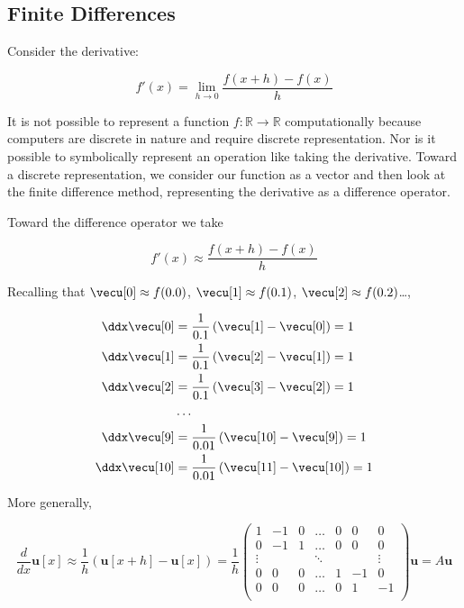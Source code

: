 \documentclass[12pt,]{book}
\begin{document}
\subsection{Finite Differences}\label{finite-differences}

Consider the derivative:

\begin{equation}f'(x)=\lim_{h\to 0} \frac{f(x+h)-f(x)}{h}\label{eq:first_derivative}\end{equation}

It is not possible to represent a function
\(f: \mathbb{R} \to \mathbb{R}\) computationally because computers are
discrete in nature and require discrete representation. Nor is it
possible to symbolically represent an operation like taking the
derivative. Toward a discrete representation, we consider our function
as a vector and then look at the finite difference method, representing
the derivative as a difference operator.

Toward the difference operator we take

\begin{equation}f'(x)\approx \frac{f(x+h)-f(x)}{h}\label{eq:first_difference}\end{equation}

Recalling that \(\vecu[0]\approx f(0.0)\), \(\vecu[1]\approx f(0.1)\),
\(\vecu[2]\approx f(0.2)\)\dots,

\begin{align*}
\ddx\vecu[0] &= \frac{1}{0.1}\left(\vecu[1] -\vecu[0]\right) = 1\\
\ddx\vecu[1] &= \frac{1}{0.1}\left(\vecu[2] -\vecu[1]\right) = 1\\
\ddx\vecu[2] &= \frac{1}{0.1}\left(\vecu[3] -\vecu[2]\right) = 1\\
&\dots\\
\ddx\vecu[9] &= \frac{1}{0.01}\left(\vecu[10] -\vecu[9]\right) = 1\\
\ddx\vecu[10] &= \frac{1}{0.01}\left(\vecu[11] -\vecu[10]\right) = 1\\
\end{align*}

More generally,

\begin{equation}\frac{d}{dx}\mathbf{u}[x] \approx \frac{1}{h}\left(\mathbf{u}[x+h]-\mathbf{u}[x]\right)=
\frac{1}{h}\left(
\begin{matrix}
1 & -1 &  0 & \dots & 0 & 0 & 0 \\
0 & -1 & 1 & \dots &  0 & 0 & 0 \\
\vdots & \ & \ & \ddots & \ & \ & \vdots \\
0 & 0 & 0 & \dots & 1 & -1 & 0 \\
0 & 0 & 0 & \dots & 0 & 1 & -1 \\
\end{matrix}\right)\mathbf{u}=A \mathbf{u}
\label{eq:first_difference_equation}\end{equation}
\end{document}
